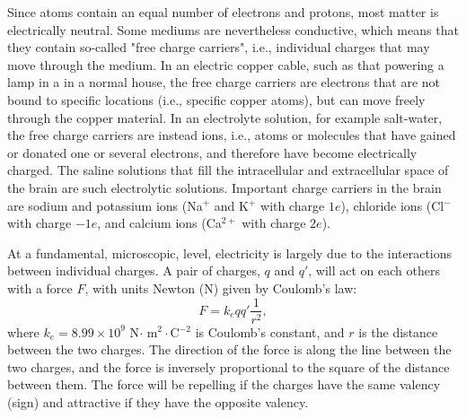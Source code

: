 Since atoms contain an equal number of electrons and protons, most matter is electrically neutral. Some mediums are nevertheless conductive, which means that they contain so-called "free charge carriers", i.e., individual charges that may move through the medium. In an electric copper cable, such as that powering a lamp in a in a normal house, the free charge carriers are electrons that are not bound to specific locations (i.e., specific copper atoms), but can move freely through the copper material. In an electrolyte solution, for example salt-water, the free charge carriers are instead ions, i.e., atoms or molecules that have gained or donated one or several electrons, and therefore have become electrically charged. The saline solutions that fill the intracellular and extracellular space of the brain are such electrolytic solutions. Important charge carriers in the brain are sodium and potassium ions (Na$^+$ and K$^+$ with charge $1e$), chloride ions (Cl$^-$ with charge $-1e$, and calcium ions (Ca$^{2+}$ with charge $2e$).

At a fundamental, microscopic, level, electricity is largely due to the interactions between individual charges. A pair of charges, $q$ and $q'$, will act on each others with a force $F$, with units Newton (N) given by Coulomb's law:
\begin{equation}
F = k_e qq' \frac{1}{r^2}, 
\label{Basics:eq:CoulombF}
\end{equation}
where $k_e = 8.99\times10^9$ N$\cdot$ m$^2\cdot$C$^{-2}$ is Coulomb's constant, and $r$ is the distance between the two charges. The direction of the force is along the line between the two charges, and the force is inversely proportional to the square of the distance between them. The force will be repelling if the charges have the same valency (sign) and attractive if they have the opposite valency. 

